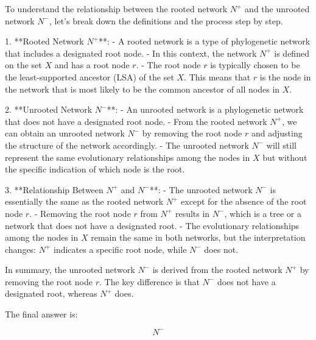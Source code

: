 To understand the relationship between the rooted network \( N^+ \) and the unrooted network \( N^- \), let's break down the definitions and the process step by step.

1. **Rooted Network \( N^+ \)**:
   - A rooted network is a type of phylogenetic network that includes a designated root node.
   - In this context, the network \( N^+ \) is defined on the set \( X \) and has a root node \( r \).
   - The root node \( r \) is typically chosen to be the least-supported ancestor (LSA) of the set \( X \). This means that \( r \) is the node in the network that is most likely to be the common ancestor of all nodes in \( X \).

2. **Unrooted Network \( N^- \)**:
   - An unrooted network is a phylogenetic network that does not have a designated root node.
   - From the rooted network \( N^+ \), we can obtain an unrooted network \( N^- \) by removing the root node \( r \) and adjusting the structure of the network accordingly.
   - The unrooted network \( N^- \) will still represent the same evolutionary relationships among the nodes in \( X \) but without the specific indication of which node is the root.

3. **Relationship Between \( N^+ \) and \( N^- \)**:
   - The unrooted network \( N^- \) is essentially the same as the rooted network \( N^+ \) except for the absence of the root node \( r \).
   - Removing the root node \( r \) from \( N^+ \) results in \( N^- \), which is a tree or a network that does not have a designated root.
   - The evolutionary relationships among the nodes in \( X \) remain the same in both networks, but the interpretation changes: \( N^+ \) indicates a specific root node, while \( N^- \) does not.

In summary, the unrooted network \( N^- \) is derived from the rooted network \( N^+ \) by removing the root node \( r \). The key difference is that \( N^- \) does not have a designated root, whereas \( N^+ \) does.

The final answer is:

\[
\boxed{N^-}
\]